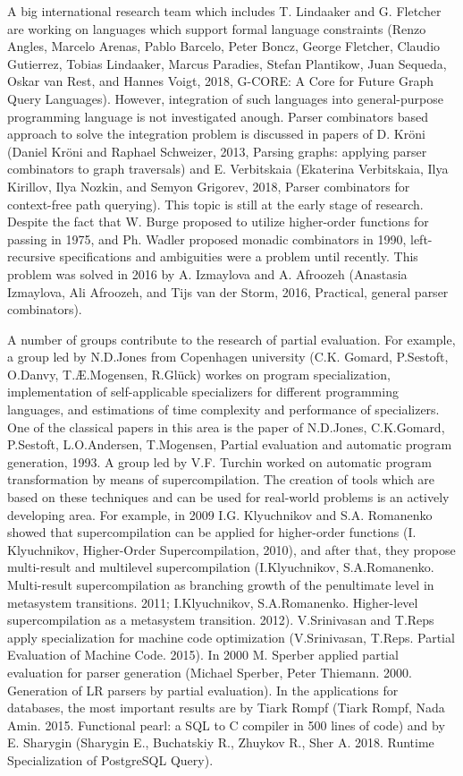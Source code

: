 \documentclass[12pt]{article}  %
\theoremstyle{remark}
\begin{document}
A big international research team which includes T. Lindaaker and G. Fletcher are working on languages which support formal language constraints (Renzo Angles, Marcelo Arenas, Pablo Barcelo, Peter Boncz, George Fletcher, Claudio Gutierrez, Tobias Lindaaker, Marcus Paradies, Stefan Plantikow, Juan Sequeda, Oskar van Rest, and Hannes Voigt, 2018, G-CORE: A Core for Future Graph Query Languages).
However, integration of such languages into general-purpose programming language is not investigated anough. 
Parser combinators based approach to solve the integration problem is discussed in papers of D.  Kröni (Daniel Kröni and Raphael Schweizer, 2013, Parsing graphs: applying parser combinators to graph traversals) and  E. Verbitskaia (Ekaterina Verbitskaia, Ilya Kirillov, Ilya Nozkin, and Semyon Grigorev, 2018, Parser combinators for context-free path querying). 
This topic is still at the early stage of research.
Despite the fact that W. Burge proposed to utilize higher-order functions for passing in 1975, and Ph. Wadler proposed monadic combinators in 1990, left-recursive specifications and ambiguities were a problem  until recently.
This problem was solved in 2016 by A. Izmaylova and A. Afroozeh (Anastasia Izmaylova, Ali Afroozeh, and Tijs van der Storm, 2016, Practical, general parser combinators).

A number of groups contribute to the research of partial evaluation.
For example, a group led by N.D.Jones from Copenhagen university (C.K. Gomard, P.Sestoft, O.Danvy, T.Æ.Mogensen, R.Glück) workes on program specialization, implementation of self-applicable specializers for different programming languages, and estimations of time complexity and performance of specializers.
One of the classical papers in this area is the paper of N.D.Jones, C.K.Gomard, P.Sestoft, L.O.Andersen, T.Mogensen,
Partial evaluation and automatic program generation, 1993.
A group led by V.F. Turchin worked on automatic program transformation by means of supercompilation.
The creation of tools which are based on these techniques and can be used for real-world problems is an actively developing area.
For example, in 2009 I.G. Klyuchnikov and S.A. Romanenko showed that supercompilation can be applied for higher-order functions (I. Klyuchnikov, Higher-Order Supercompilation, 2010), and after that, they propose multi-result and multilevel supercompilation
(I.Klyuchnikov, S.A.Romanenko. Multi-result supercompilation as branching growth of the penultimate level in metasystem transitions. 2011; I.Klyuchnikov, S.A.Romanenko. Higher-level supercompilation as a metasystem transition. 2012).
V.Srinivasan and T.Reps apply specialization for machine code optimization (V.Srinivasan, T.Reps. Partial Evaluation of Machine Code. 2015).
In 2000 M. Sperber applied partial evaluation for parser generation (Michael Sperber, Peter Thiemann. 2000. Generation of LR parsers by partial evaluation). 
In the applications for databases, the most important results are by Tiark Rompf (Tiark Rompf, Nada Amin. 2015. Functional pearl: a SQL to C compiler in 500 lines of code) and by E. Sharygin (Sharygin E., Buchatskiy R., Zhuykov R., Sher A. 2018. Runtime Specialization of PostgreSQL Query).
\end{document}
